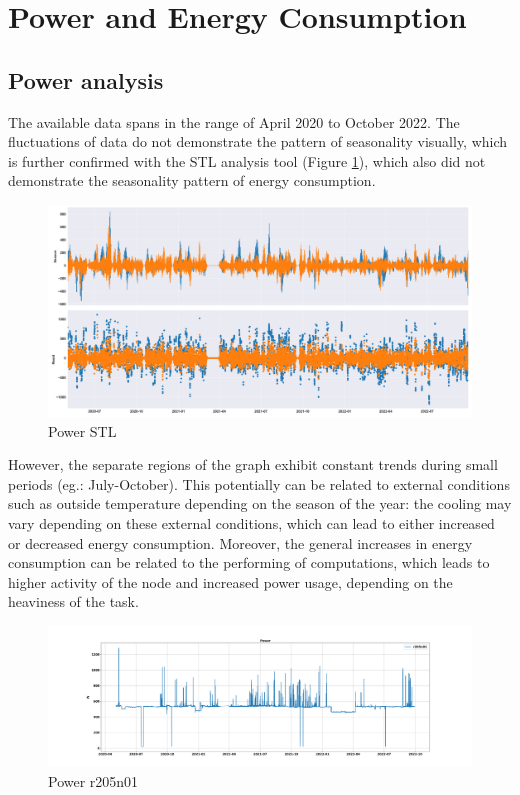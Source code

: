 \section{Power and Energy Consumption}
\noindent

\subsection{Power analysis}
The available data spans in the range of April 2020 to October 2022. 
The fluctuations of data do not demonstrate the pattern of seasonality visually, which is further confirmed with the STL analysis tool (Figure \ref{fig:PWR_STL}), which also did not demonstrate the seasonality pattern of energy consumption.

\begin{figure}[H]
    \centering
    \includegraphics[width=1\textwidth]{Figures/PWR_STL.png}
    \caption{Power STL}
    \label{fig:PWR_STL}
\end{figure}

However, the separate regions of the graph exhibit constant trends during small periods (eg.: July-October).
This potentially can be related to external conditions such as outside temperature depending on the season of the year: the cooling may vary depending on these external conditions, which can lead to either increased or decreased energy consumption.
Moreover, the general increases in energy consumption can be related to the performing of computations, which leads to higher activity of the node and increased power usage, depending on the heaviness of the task.

\begin{figure}[H]
    \centering
    \includegraphics[width=1\textwidth]{Figures/PWR_r205n01.png}
    \caption{Power r205n01}
    \label{fig:PWR_r205n01}
\end{figure}

